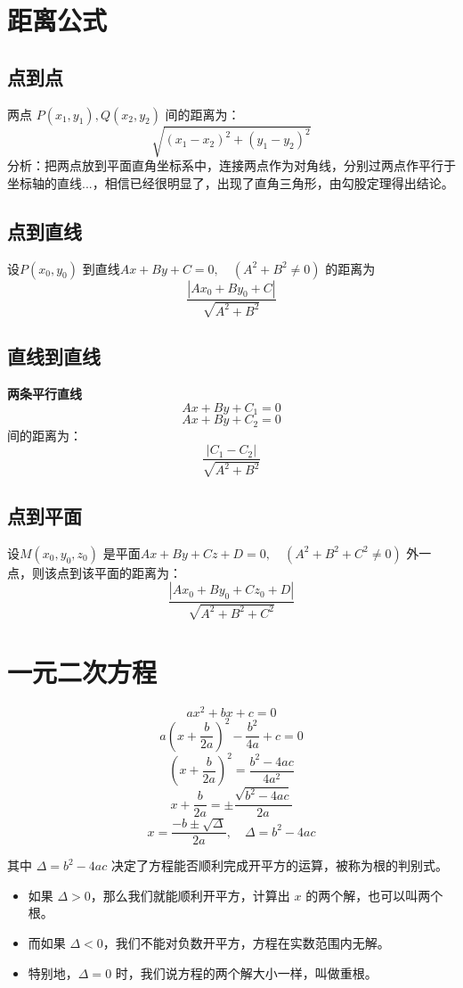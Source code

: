 \documentclass[a4paper,12pt]{ctexart}
\begin{document}
\section*{距离公式}

\subsection*{点到点}
两点 $P(x_1, y_1), Q(x_2, y_2)$ 间的距离为：
\[ \sqrt{(x_1 - x_2)^2 + (y_1 - y_2)^2} \]
\small{分析：把两点放到平面直角坐标系中，连接两点作为对角线，分别过两点作平行于坐标轴的直线...，相信已经很明显了，出现了直角三角形，由勾股定理得出结论。}

\subsection*{点到直线}
设$P(x_0, y_0)$ 到直线$Ax + By + C = 0, \quad (A^2 + B^2 \neq 0)$ 的距离为
\[ \frac{|Ax_0 + By_0 + C|}{\sqrt{A^2 + B^2}} \]

\subsection*{直线到直线}
\textbf{两条平行直线}
\[ Ax + By + C_1 = 0 \]
\[ Ax + By + C_2 = 0 \]
间的距离为：
\[ \frac{|C_1 - C_2|}{\sqrt{A^2 + B^2}} \]

\subsection*{点到平面}
设$M(x_0, y_0, z_0)$ 是平面$Ax + By + Cz + D = 0, \quad (A^2 + B^2 + C^2 \neq 0)$ 外一点，则该点到该平面的距离为：
\[ \frac{|Ax_0 + By_0 + Cz_0 + D|}{\sqrt{A^2 + B^2 + C^2}} \]

\section*{一元二次方程}

\[ ax^2 + bx + c = 0 \]
\[ a(x + \frac{b}{2a})^2 - \frac{b^2}{4a} + c = 0 \]
\[ (x + \frac{b}{2a})^2 = \frac{b^2 - 4ac}{4a^2} \]
\[ x + \frac{b}{2a} = \pm \frac{\sqrt{b^2 - 4ac}}{2a} \]
\[ x = \frac{-b \pm \sqrt{\Delta}}{2a}, \quad \Delta = b^2 - 4ac \]

其中 $\Delta = b^2 - 4ac$ 决定了方程能否顺利完成开平方的运算，被称为根的判别式。
\begin{itemize}
    \item 如果 $\Delta > 0$，那么我们就能顺利开平方，计算出 $x$ 的两个解，也可以叫两个根。
    \item 而如果 $\Delta < 0$，我们不能对负数开平方，方程在实数范围内无解。
    \item 特别地，$\Delta = 0$ 时，我们说方程的两个解大小一样，叫做重根。
\end{itemize}
\end{document}
